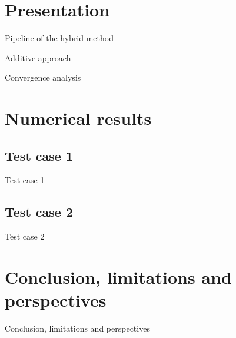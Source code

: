 \section{Presentation}

\begin{frame}{Pipeline of the hybrid method}
	\todo
\end{frame}

\begin{frame}{Additive approach}
	\todo
\end{frame}

\begin{frame}{Convergence analysis}
	\todo
\end{frame}

\section{Numerical results}

\subsection{Test case 1}

\begin{frame}{Test case 1}
	\todo
\end{frame}

\subsection{Test case 2}

\begin{frame}{Test case 2}
	\todo
\end{frame}

\section{Conclusion, limitations and perspectives}

\begin{frame}{Conclusion, limitations and perspectives}
	\todo
\end{frame}